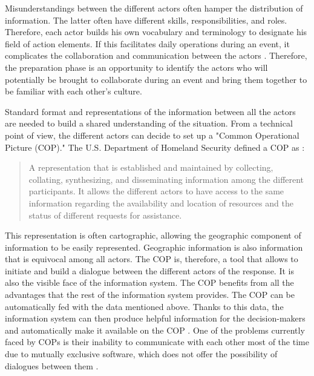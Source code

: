 Misunderstandings between the different actors often hamper the distribution of information.
The latter often have different skills, responsibilities, and roles.
Therefore, each actor builds his own vocabulary and terminology to designate his field of action elements.
If this facilitates daily operations during an event, it complicates the collaboration and communication between the actors \textcite{opachMapbasedInterfacesCommon2020}.
Therefore, the preparation phase is an opportunity to identify the actors who will potentially be brought to collaborate during an event and bring them together to be familiar with each other's culture.

Standard format and representations of the information between all the actors are needed to build a shared understanding of the situation.
From a technical point of view, the different actors can decide to set up a "Common Operational Picture (COP)."
The U.S. Department of Homeland Security defined a COP as \parencite{u.s.departmentofhomelandsecurityNationalIncidentManagement2014}:
\blockquote{A representation that is established and maintained by collecting, collating, synthesizing, and disseminating information among the different participants.
    It allows the different actors to have access to the same information regarding the availability and location of resources and the status of different requests for assistance.}
This representation is often cartographic, allowing the geographic component of information to be easily represented.
Geographic information is also information that is equivocal among all actors.
The COP is, therefore, a tool that allows to initiate and build a dialogue between the different actors of the response.
It is also the visible face of the information system.
The COP benefits from all the advantages that the rest of the information system provides.
The COP can be automatically fed with the data mentioned above.
Thanks to this data, the information system can then produce helpful information for the decision-makers and automatically make it available on the COP \textcite{fertierInterpretationAutomatiqueDonnees2018}.
One of the problems currently faced by COPs is their inability to communicate with each other most of the time due to mutually exclusive software, which does not offer the possibility of dialogues between them \textcite{opachMapbasedInterfacesCommon2020}.


